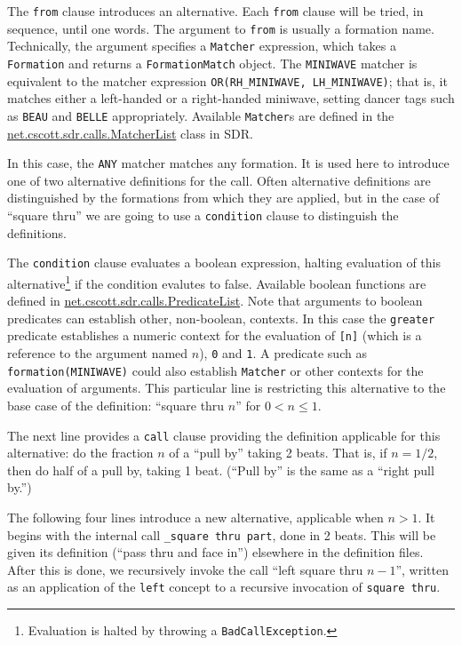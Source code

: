 \documentclass[12pt]{article}
\newcommand{\clause}[1]{\texttt{#1}}
\renewcommand{\call}[1]{\texttt{#1}} %
\newcommand{\package}[1]{\url{#1}}
\begin{document}
The \clause{from} clause introduces an alternative.  Each
\clause{from} clause will be tried, in sequence, until one words.  The
argument to \clause{from} is usually a formation name.  Technically,
the argument specifies a \texttt{Matcher} expression, which takes a
\texttt{Formation} and returns a \texttt{FormationMatch} object.
The \texttt{MINIWAVE} matcher is equivalent to the matcher expression
\texttt{OR(RH\_MINIWAVE, LH\_MINIWAVE)}; that is, it matches either a
left-handed or a right-handed miniwave, setting dancer tags such as
\texttt{BEAU} and \texttt{BELLE} appropriately.  Available
\texttt{Matcher}s are defined in the
\package{net.cscott.sdr.calls.MatcherList} class in SDR.

In this case, the \texttt{ANY} matcher matches any formation.  It is
used here to introduce one of two alternative definitions for the
call.  Often alternative definitions are distinguished by the
formations from which they are applied, but in the case of ``square
thru'' we are going to use a \clause{condition} clause to distinguish
the definitions.

The \clause{condition} clause evaluates a boolean expression, halting
evaluation of this alternative\footnote{Evaluation is halted by
  throwing a \texttt{BadCallException}.} if the condition evalutes to
false.  Available boolean functions are defined in
\package{net.cscott.sdr.calls.PredicateList}.  Note that arguments to
boolean predicates can establish other, non-boolean, contexts.  In
this case the \call{greater} predicate establishes a numeric context for
the evaluation of \texttt{[n]} (which is a reference to the argument
named $n$), \texttt{0} and \texttt{1}.  A predicate such as
\texttt{formation(MINIWAVE)} could also establish \texttt{Matcher} or other
contexts for the evaluation of arguments.  This particular line is
restricting this alternative to the base case of the definition:
``square thru $n$'' for $0 < n \leq 1$.

The next line provides a \clause{call} clause providing the definition
applicable for this alternative: do the fraction $n$ of a
``pull by'' taking 2 beats.  That is, if $n=1/2$, then do half of a
pull by, taking 1 beat.  (``Pull by'' is the same as a ``right pull by.'')

The following four lines introduce a new alternative, applicable when $n>1$.
It begins with the internal call \call{\_square thru part}, done in 2
beats.  This will be given its definition (``pass thru and face in'')
elsewhere in the definition files.  After this is done, we recursively
invoke the call ``left square thru $n-1$'', written as an application
of the \call{left} concept to a recursive invocation of \call{square thru}.
\end{document}
